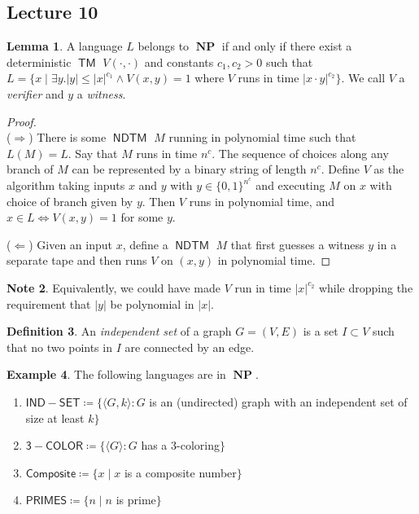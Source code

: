 \documentclass[10pt,letterpaper,cm]{nupset}
\theoremstyle{definition}
\newtheorem{definition}{Definition}[subsection]
\newtheorem{exmp}[definition]{Example}
\newtheorem{note}[definition]{Note}
\theoremstyle{theorem}
\newtheorem{lemma}[definition]{Lemma}
\theoremstyle{remark}
\newcommand{\1}{\mathbf{1}}
\newcommand{\0}{\vec 0}
\DeclareMathOperator{\TM}{\mathsf{TM}}
\DeclareMathOperator{\NP}{\mathbf{NP}}
\DeclareMathOperator{\NDTM}{\mathsf{NDTM}}
\begin{document}
\subsection{Lecture 10}

\begin{lemma}
A language $L$  belongs to $\NP$ if and only if there exist  a deterministic $\TM$ $V(\cdot, \cdot)$ and constants $c_1, c_2 >0$ such that $L = \{ x \mid \exists y.|y| \leq |x|^{c_1} \land V(x,y) = 1$ where $V$ runs in time $|x\cdot y|^{c_2}\}$. We call $V$ a \textit{verifier} and $y$ a \textit{witness}.
\end{lemma}
\begin{proof} $ $
\\
($\Longrightarrow$) There is some $\NDTM$ $M$ running in polynomial time such that $L(M) = L$. Say that $M$ runs in time $n^c$. The sequence of choices along any branch of $M$ can be represented by a binary string of length $n^c$.
Define $V$ as the algorithm taking inputs $x$ and $y$ with $y\in  \{0,1\}^{n^c}$ and executing $M$ on $x$ with choice of branch given by $y$. Then $V$ runs in polynomial time, and $x\in L \iff V(x,y) =1$ for some $y$.

\medskip


($\Longleftarrow$)  Given an input $x$, define a $\NDTM$ $M$ that first guesses a witness $y$ in a separate tape and then runs $V$ on $(x,y)$ in polynomial time. 
\end{proof}

\begin{note}
Equivalently, we could have made $V$ run in time $|x|^{c_2}$ while dropping the requirement that $|y|$ be polynomial in $|x|$. 
\end{note}

\begin{definition}
An \textit{independent set} of a graph $G=(V,E)$ is a set $I\subset V$ such that no two points in $I$ are connected by an edge. 
\end{definition}

\begin{exmp} The following languages are in $\NP$.
\begin{enumerate}
\item $\mathsf{IND{-}SET} \coloneqq \{\langle G, k \rangle : G$ is an (undirected) graph with an independent set of size at least $k\}$
\item $\mathsf{3{-}COLOR}\coloneqq \{ \langle G \rangle : G$ has a $3$-coloring$\}$
\item $\mathsf{Composite} \coloneqq \{x \mid x$ is a composite number$\}$
\item $\mathsf{PRIMES}\coloneqq \{ n \mid n$ is prime$\}$
\end{enumerate}
\end{exmp}
\end{document}
